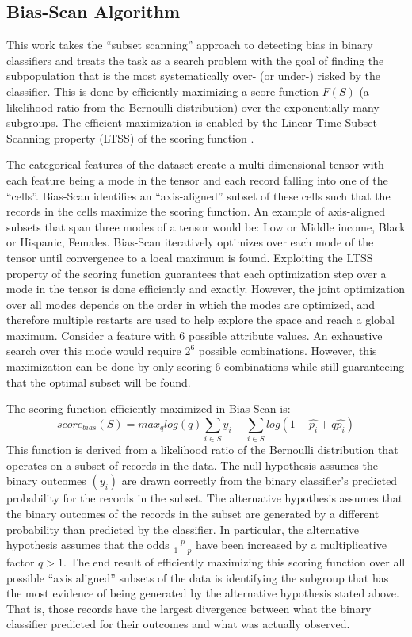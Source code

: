 \documentclass[dvipdft]{article}
\begin{document}
\subsection{Bias-Scan Algorithm}
This work takes the ``subset scanning'' approach to detecting bias in binary classifiers \cite{zhang2017} and treats the task as a search problem with the goal of finding the subpopulation that is the most systematically over- (or under-) risked by the classifier. This is done by efficiently maximizing a score function $F(S)$ (a likelihood ratio from the Bernoulli distribution) over the exponentially many subgroups.  The efficient maximization is enabled by the Linear Time Subset Scanning property (LTSS) of the scoring function \cite{neill-ltss-2012}.

The categorical features of the dataset create a multi-dimensional tensor with each feature being a mode in the tensor and each record falling into one of the ``cells''.  Bias-Scan identifies an ``axis-aligned'' subset of these cells such that the records in the cells maximize the scoring function.  An example of axis-aligned subsets that span three modes of a tensor would be: Low or Middle income, Black or Hispanic, Females. Bias-Scan iteratively optimizes over each mode of the tensor until convergence to a local maximum is found.  Exploiting the LTSS property of the scoring function guarantees that each optimization step over a mode in the tensor is done efficiently and exactly.  However, the joint optimization over all modes depends on the order in which the modes are optimized, and therefore multiple restarts are used to help explore the space and reach a global maximum.  Consider a feature with 6 possible attribute values.  An exhaustive search over this mode would require $2^{6}$ possible combinations.  However, this maximization can be done by only scoring 6 combinations while still guaranteeing that the optimal subset will be found. 

The scoring function efficiently maximized in Bias-Scan is: %
\[
score_{bias}(S) = max_q  log(q)\sum_{i\in S} y_i - \sum_{i\in S} log(1-\hat{p_i} + q\hat{p_i})
\]
This function is derived from a likelihood ratio of the Bernoulli distribution that operates on a subset of records in the data.  The null hypothesis assumes the binary outcomes $(y_i)$ are drawn correctly from the binary classifier's predicted probability for the records in the subset. The alternative hypothesis assumes that the binary outcomes of the records in the subset are generated by a different probability than predicted by the classifier.  In particular, the alternative hypothesis assumes that the odds $\frac{p}{1-p}$ have been increased by a multiplicative factor $q>1$. The end result of efficiently maximizing this scoring function over all possible ``axis aligned'' subsets of the data is identifying the subgroup that has the most evidence of being generated by the alternative hypothesis stated above.  That is, those records have the largest divergence between what the binary classifier predicted for their outcomes and what was actually observed.
\end{document}
